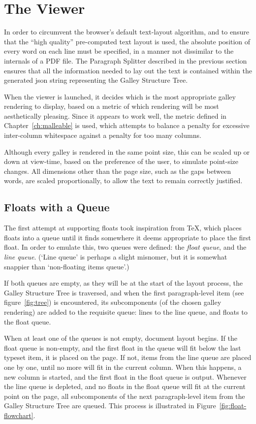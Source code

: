 \section{The Viewer}
\label{sec:viewer}

In order to circumvent the browser's default text-layout algorithm, and to ensure that the ``high quality'' pre-computed text layout is used, the absolute position of every word on each line must be specified, in a manner not dissimilar to the internals of a PDF file. The Paragraph Splitter described in the previous section ensures that all the information needed to lay out the text is contained within the generated \gls{json} string representing the Galley Structure Tree.


When the viewer is launched, it decides which is the most appropriate galley rendering to display, based on a metric of which rendering will be most aesthetically pleasing. Since it appears to work well, the metric defined in Chapter~\ref{ch:malleable} is used, which attempts to balance a penalty for excessive inter-column whitespace against a penalty for too many columns. 

Although every galley is rendered in the same point size, this can be scaled up or down at view-time, based on the preference of the user, to simulate point-size changes. All dimensions other than the page size, such as the gaps between words, are scaled proportionally, to allow the text to remain correctly justified.




\subsection{Floats with a Queue}
The first attempt at supporting floats took inspiration from \TeX, which places floats into a queue until it finds somewhere it deems appropriate to place the first float. In order to emulate this, two queues were defined: the \emph{float queue}, and the \emph{line queue}. (`Line queue' is perhaps a slight misnomer, but it is somewhat snappier than `non-floating items queue'.)


If both queues are empty, as they will be at the start of the layout process, the Galley Structure Tree is traversed, and when the first paragraph-level item (see figure~\ref{fig:tree}) is encountered, its subcomponents (of the chosen galley rendering) are added to the requisite queue: lines to the line queue, and floats to the float queue.

When at least one of the queues is not empty, document layout begins. If the float queue is non-empty, and the first float in the queue will fit below the last typeset item, it is placed on the page. If not, items from the line queue are placed one by one, until no more will fit in the current column. When this happens, a new column is started, and the first float in the float queue is output. Whenever the line queue is depleted, and no floats in the float queue will fit at the current point on the page, all subcomponents of the next paragraph-level item from the Galley Structure Tree are queued. This process is illustrated in Figure~\ref{fig:float-flowchart}.

